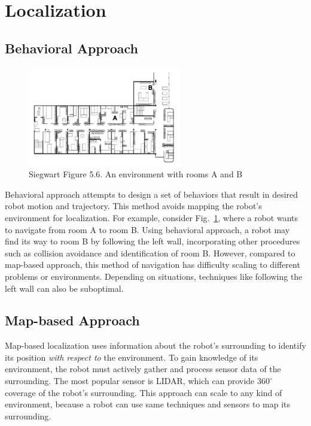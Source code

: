 \documentclass[twoside]{article}
\begin{document}
\section{Localization}
\subsection{Behavioral Approach}

\begin{figure}[h!]
	\centering
    \includegraphics[width=0.6\textwidth]{img/Siegwart_5_6.png}
    \caption{Siegwart Figure 5.6. An environment with rooms A and B}
    \label{fig:siegwart_5_6}
\end{figure}

Behavioral approach attempts to design a set of behaviors that result in desired robot motion and trajectory. This method avoids mapping the robot's environment for localization. For example, consider Fig.~\ref{fig:siegwart_5_6}, where a robot wants to navigate from room A to room B. Using behavioral approach, a robot may find its way to room B by following the left wall, incorporating other procedures such as collision avoidance and identification of room B. However, compared to map-based approach, this method of navigation has difficulty scaling to different problems or environments. Depending on situations, techniques like following the left wall can also be suboptimal.

\subsection{Map-based Approach}

Map-based localization uses information about the robot's surrounding to identify its position \textit{with respect to} the environment. To gain knowledge of its environment, the robot must actively gather and process sensor data of the surrounding. The most popular sensor is LIDAR, which can provide $360^\circ$ coverage of the robot's surrounding. This approach can scale to any kind of environment, because a robot can use same techniques and sensors to map its surrounding.
\end{document}
